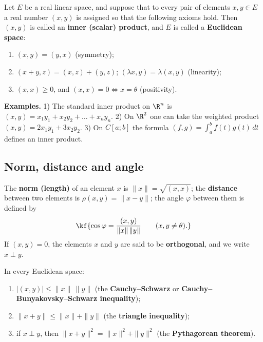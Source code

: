
\begin{tarif}
Let $E$ be a real linear space, and suppose that to every pair of elements
$x,y\in E$ a real number $(x,y)$ is assigned so that the following axioms hold.
Then $(x,y)$ is called an \textbf{inner (scalar) product}, and $E$ is called a
\textbf{Euclidean space}:
\begin{enumerate}[label=\arabic*)]
\item $(x,y)=(y,x)$ (symmetry);
\item $(x+y,z)=(x,z)+(y,z)$; \quad $(\lambda x,y)=\lambda(x,y)$ (linearity);
\item $(x,x)\geq0$, and $(x,x)=0\iff x=\theta$ (positivity).
\end{enumerate}
\end{tarif}

\textbf{Examples.} 1) The standard inner product on $\R^n$ is
$(x,y)=x_1y_1+x_2y_2+\dots+x_ny_n$.
2) On $\R^2$ one can take the weighted product $(x,y)=2x_1y_1+3x_2y_2$.
3) On $C[a;b]$ the formula $(f,g)=\displaystyle\int_a^b f(t)g(t)\,dt$ defines an inner product.

\subsection{Norm, distance and angle}

\begin{tarif}
The \textbf{norm (length)} of an element $x$ is $\|x\|=\sqrt{(x,x)}$; the
\textbf{distance} between two elements is $\rho(x,y)=\|x-y\|$; the angle
$\varphi$ between them is defined by
\[\kf{\cos\varphi=\frac{(x,y)}{\|x\|\,\|y\|}\qquad(x,y\neq\theta).}\]
If $(x,y)=0$, the elements $x$ and $y$ are said to be \textbf{orthogonal}, and we write $x\perp y$.
\end{tarif}

\begin{teorema}
In every Euclidean space:
\begin{enumerate}[label=\arabic*)]
\item $|(x,y)|\leq\|x\|\,\|y\|$ (the \textbf{Cauchy–Schwarz} or \textbf{Cauchy–Bunyakovsky–Schwarz inequality});
\item $\|x+y\|\leq\|x\|+\|y\|$ (the \textbf{triangle inequality});
\item if $x\perp y$, then $\|x+y\|^2=\|x\|^2+\|y\|^2$ (the \textbf{Pythagorean theorem}).
\end{enumerate}
\end{teorema}

